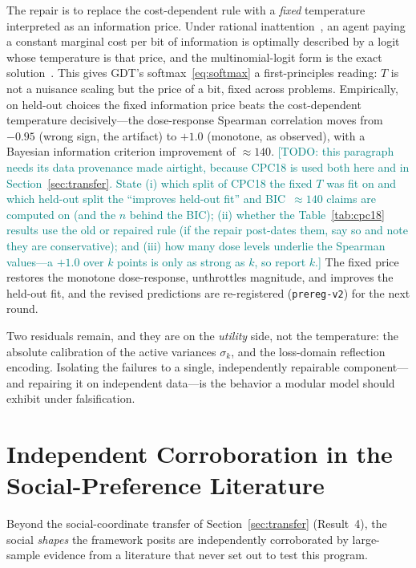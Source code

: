 \documentclass[journal]{IEEEtran}
\newcommand{\rev}[1]{\textcolor{teal}{#1}}
\begin{document}
The repair is to replace the cost-dependent rule with a \emph{fixed} temperature interpreted as an information price.
Under rational inattention~\cite{sims2003}, an agent paying a constant marginal cost per bit of information is optimally described by a logit whose temperature is that price, and the multinomial-logit form is the exact solution~\cite{matejka2015}.
This gives GDT's softmax~\eqref{eq:softmax} a first-principles reading: $T$ is not a nuisance scaling but the price of a bit, fixed across problems.
Empirically, on held-out choices the fixed information price beats the cost-dependent temperature decisively---the dose-response Spearman correlation moves from $-0.95$ (wrong sign, the artifact) to $+1.0$ (monotone, as observed), with a Bayesian information criterion improvement of $\approx140$.
\rev{[TODO: this paragraph needs its data provenance made airtight, because CPC18 is used both here and in Section~\ref{sec:transfer}. State (i) which split of CPC18 the fixed $T$ was fit on and which held-out split the ``improves held-out fit'' and BIC~$\approx140$ claims are computed on (and the $n$ behind the BIC); (ii) whether the Table~\ref{tab:cpc18} results use the old or repaired rule (if the repair post-dates them, say so and note they are conservative); and (iii) how many dose levels underlie the Spearman values---a $+1.0$ over $k$ points is only as strong as $k$, so report $k$.]}
The fixed price restores the monotone dose-response, unthrottles magnitude, and improves the held-out fit, and the revised predictions are re-registered (\texttt{prereg-v2}) for the next round.

Two residuals remain, and they are on the \emph{utility} side, not the temperature: the absolute calibration of the active variances $\sigma_k$, and the loss-domain reflection encoding.
Isolating the failures to a single, independently repairable component---and repairing it on independent data---is the behavior a modular model should exhibit under falsification.

\section{Independent Corroboration in the Social-Preference Literature}
\label{sec:corroboration}

Beyond the social-coordinate transfer of Section~\ref{sec:transfer} (Result~4), the social \emph{shapes} the framework posits are independently corroborated by large-sample evidence from a literature that never set out to test this program.
\end{document}
